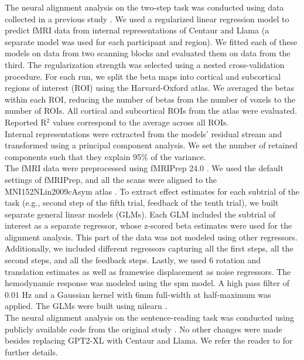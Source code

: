 \documentclass[pdflatex,sn-nature]{sn-jnl}%
\theoremstyle{thmstyleone}%
\theoremstyle{thmstyletwo}%
\theoremstyle{thmstylethree}%
\begin{document}
The neural alignment analysis on the two-step task was conducted using data collected in a previous study \cite{feher2023rethinking}. We used a regularized linear regression model to predict fMRI data from internal representations of Centaur and Llama (a separate model was used for each participant and region). We fitted each of these models on data from two scanning blocks and evaluated them on data from the third. The regularization strength was selected using a nested cross-validation procedure.  For each run, we split the beta maps into cortical and subcortical regions of interest (ROI) using the Harvard-Oxford atlas. We averaged the betas within each ROI, reducing the number of betas from the number of voxels to the number of ROIs. All cortical and subcortical ROIs from the atlas were evaluated. Reported R$^2$ values correspond to the average across all ROIs. \\
Internal representations were extracted from the models' residual stream and transformed using a principal component analysis. We set the number of retained components such that they explain 95\% of the variance. \\
The fMRI data were preprocessed using fMRIPrep 24.0 \cite{esteban2019fmriprep}. We used the default settings of fMRIPrep, and all the scans were aligned to the MNI152NLin2009cAsym atlas \cite{fonov2009unbiased}. To extract effect estimates for each subtrial of the task (e.g., second step of the fifth trial, feedback of the tenth trial), we built separate general linear models (GLMs). Each GLM included the subtrial of interest as a separate regressor, whose z-scored beta estimates were used for the alignment analysis. This part of the data was not modeled using other regressors. Additionally, we included different regressors capturing all the first steps, all the second steps, and all the feedback steps. Lastly, we used $6$ rotation and translation estimates as well as framewise displacement as noise regressors. The hemodynamic response was modeled using the spm \cite{penny2011statistical} model. A high pass filter of $0.01$ Hz and a Gaussian kernel with $6$mm full-width at half-maximum was applied. The GLMs were built using nilearn \cite{Nilearn}. \\

The neural alignment analysis on the sentence-reading task was conducted using publicly available code from the original study \cite{tuckute2024driving}. No other changes were made besides replacing \textsc{GPT2-XL} with Centaur and Llama. We refer the reader to \cite{tuckute2024driving} for further details.
\end{document}
